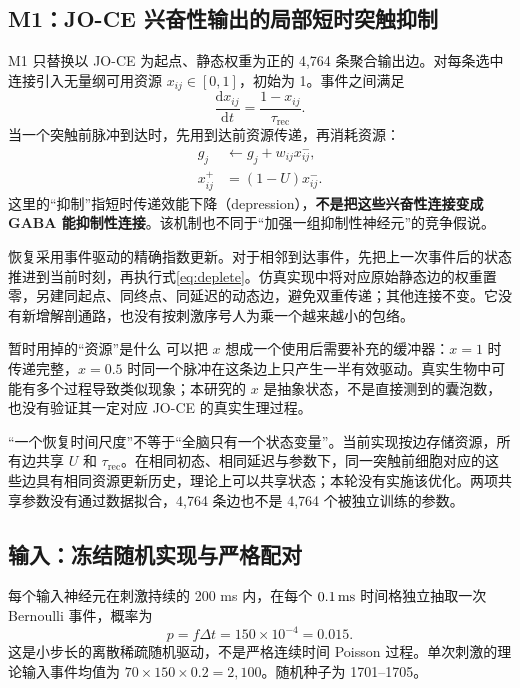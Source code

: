 \subsection{M1：JO-CE 兴奋性输出的局部短时突触抑制}
\label{sec:std}
M1 只替换以 JO-CE 为起点、静态权重为正的 4,764 条聚合输出边。对每条选中连接引入无量纲可用资源 $x_{ij}\in[0,1]$，初始为 1。事件之间满足
\begin{equation}
\frac{\mathrm{d}x_{ij}}{\mathrm{d}t}=\frac{1-x_{ij}}{\tau_{\mathrm{rec}}}.
\label{eq:resource}
\end{equation}
当一个突触前脉冲到达时，先用到达前资源传递，再消耗资源：
\begin{align}
g_j&\leftarrow g_j+w_{ij}x_{ij}^{-},\\
x_{ij}^{+}&=(1-U)x_{ij}^{-}.\label{eq:deplete}
\end{align}
这里的“抑制”指短时传递效能下降（depression），\textbf{不是把这些兴奋性连接变成 GABA 能抑制性连接}。该机制也不同于“加强一组抑制性神经元”的竞争假说。

恢复采用事件驱动的精确指数更新。对于相邻到达事件，先把上一次事件后的状态推进到当前时刻，再执行式\eqref{eq:deplete}。仿真实现中将对应原始静态边的权重置零，另建同起点、同终点、同延迟的动态边，避免双重传递；其他连接不变。它没有新增解剖通路，也没有按刺激序号人为乘一个越来越小的包络。

\begin{primer}{暂时用掉的“资源”是什么}
可以把 $x$ 想成一个使用后需要补充的缓冲器：$x=1$ 时传递完整，$x=0.5$ 时同一个脉冲在这条边上只产生一半有效驱动。真实生物中可能有多个过程导致类似现象；本研究的 $x$ 是抽象状态，不是直接测到的囊泡数，也没有验证其一定对应 JO-CE 的真实生理过程。
\end{primer}

“一个恢复时间尺度”不等于“全脑只有一个状态变量”。当前实现按边存储资源，所有边共享 $U$ 和 $\tau_{\mathrm{rec}}$。在相同初态、相同延迟与参数下，同一突触前细胞对应的这些边具有相同资源更新历史，理论上可以共享状态；本轮没有实施该优化。两项共享参数没有通过数据拟合，4,764 条边也不是 4,764 个被独立训练的参数。

\subsection{输入：冻结随机实现与严格配对}
每个输入神经元在刺激持续的 200 ms 内，在每个 $0.1\,\mathrm{ms}$ 时间格独立抽取一次 Bernoulli 事件，概率为
\begin{equation}
p=f\Delta t=150\times 10^{-4}=0.015.
\end{equation}
这是小步长的离散稀疏随机驱动，不是严格连续时间 Poisson 过程。单次刺激的理论输入事件均值为 $70\times150\times0.2=2,100$。随机种子为 1701--1705。

